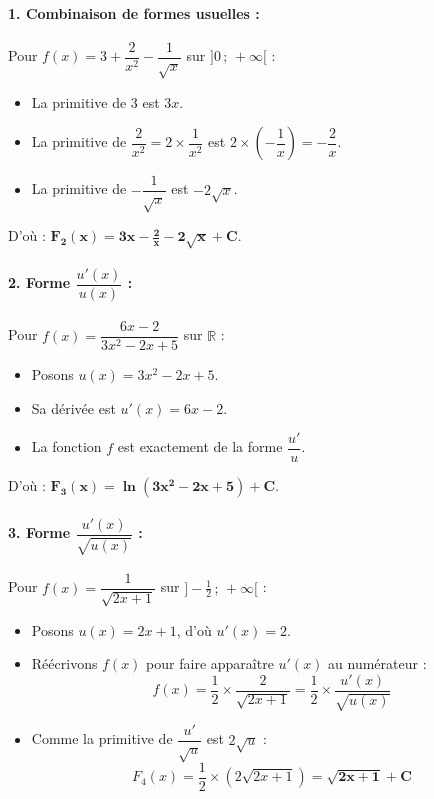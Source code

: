 \documentclass[12pt,a4paper]{article}
\begin{document}
\begin{tcolorbox}[colback=gray!5!white,colframe=myblue,title=\textbf{Correction détaillée}]

\paragraph{1. Combinaison de formes usuelles :}
Pour $f(x) = 3 + \dfrac{2}{x^2} - \dfrac{1}{\sqrt{x}}$ sur $]0 \,;\, +\infty[$ :
\begin{itemize}
    \item La primitive de $3$ est $3x$.
    \item La primitive de $\dfrac{2}{x^2} = 2 \times \dfrac{1}{x^2}$ est $2 \times \left(-\dfrac{1}{x}\right) = -\dfrac{2}{x}$.
    \item La primitive de $-\dfrac{1}{\sqrt{x}}$ est $-2\sqrt{x}$.
\end{itemize}
D'où : $\mathbf{F_2(x) = 3x - \frac{2}{x} - 2\sqrt{x} + C}$.

\paragraph{2. Forme $\dfrac{u'(x)}{u(x)}$ :}
Pour $f(x) = \dfrac{6x - 2}{3x^2 - 2x + 5}$ sur $\mathbb{R}$ :
\begin{itemize}
    \item Posons $u(x) = 3x^2 - 2x + 5$.
    \item Sa dérivée est $u'(x) = 6x - 2$.
    \item La fonction $f$ est exactement de la forme $\dfrac{u'}{u}$.
\end{itemize}
D'où : $\mathbf{F_3(x) = \ln(3x^2 - 2x + 5) + C}$.

\paragraph{3. Forme $\dfrac{u'(x)}{\sqrt{u(x)}}$ :}
Pour $f(x) = \dfrac{1}{\sqrt{2x + 1}}$ sur $]-\frac{1}{2} \,;\, +\infty[$ :
\begin{itemize}
    \item Posons $u(x) = 2x + 1$, d'où $u'(x) = 2$.
    \item Réécrivons $f(x)$ pour faire apparaître $u'(x)$ au numérateur :
    \[
    f(x) = \frac{1}{2} \times \frac{2}{\sqrt{2x + 1}} = \frac{1}{2} \times \frac{u'(x)}{\sqrt{u(x)}}
    \]
    \item Comme la primitive de $\dfrac{u'}{\sqrt{u}}$ est $2\sqrt{u}$ :
    \[
    F_4(x) = \frac{1}{2} \times \left(2\sqrt{2x + 1}\right) = \mathbf{\sqrt{2x + 1} + C}
    \]
\end{itemize}


\end{tcolorbox}
\end{document}
